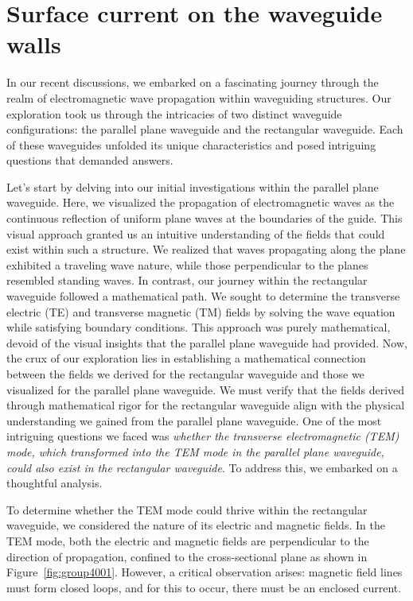 \chapter{Surface current on the waveguide 
walls}
In our recent discussions, we embarked on a fascinating journey through the realm of electromagnetic wave propagation within waveguiding structures. Our exploration took us through the intricacies of two distinct waveguide configurations: the parallel plane waveguide and the rectangular waveguide. Each of these waveguides unfolded its unique characteristics and posed intriguing questions that demanded answers.

Let's start by delving into our initial investigations within the parallel plane waveguide. Here, we visualized the propagation of electromagnetic waves as the continuous reflection of uniform plane waves at the boundaries of the guide. This visual approach granted us an intuitive understanding of the fields that could exist within such a structure. We realized that waves propagating along the plane exhibited a traveling wave nature, while those perpendicular to the planes resembled standing waves. In contrast, our journey within the rectangular waveguide followed a mathematical path. We sought to determine the transverse electric (TE) and transverse magnetic (TM) fields by solving the wave equation while satisfying boundary conditions. This approach was purely mathematical, devoid of the visual insights that the parallel plane waveguide had provided. Now, the crux of our exploration lies in establishing a mathematical connection between the fields we derived for the rectangular waveguide and those we visualized for the parallel plane waveguide. We must verify that the fields derived through mathematical rigor for the rectangular waveguide align with the physical understanding we gained from the parallel plane waveguide. One of the most intriguing questions we faced was \emph{whether the transverse electromagnetic (TEM) mode, which transformed into the TEM mode in the parallel plane waveguide, could also exist in the rectangular waveguide}. To address this, we embarked on a thoughtful analysis.

To determine whether the TEM mode could thrive within the rectangular waveguide, we considered the nature of its electric and magnetic fields. In the TEM mode, both the electric and magnetic fields are perpendicular to the direction of propagation, confined to the cross-sectional plane as shown in Figure~\ref{fig:group4001}. However, a critical observation arises: magnetic field lines must form closed loops, and for this to occur, there must be an enclosed current.


